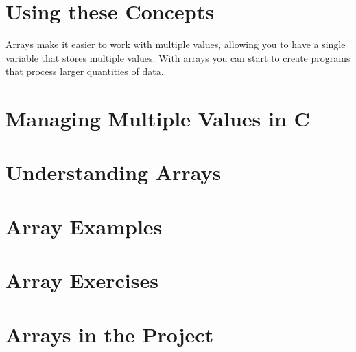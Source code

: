 
\clearpage
\section{Using these Concepts} %
\label{sec:arrays_using_these_concepts}

Arrays make it easier to work with multiple values, allowing you to have a single variable that stores multiple values. With arrays you can start to create programs that process larger quantities of data.





\clearpage
\def\pageLang{c}
\section{Managing Multiple Values in C} %
\label{sec:arrays_in_c}









\clearpage
\def\pageLang{none}
\section{Understanding Arrays} %
\label{sec:understanding_arrays}




\clearpage
\section{Array Examples} %
\label{sec:array_examples}



\clearpage
\section{Array Exercises} %
\label{sec:array_exercises}



\clearpage
\section{Arrays in the Project} %
\label{sec:arrays_in_the_project}

